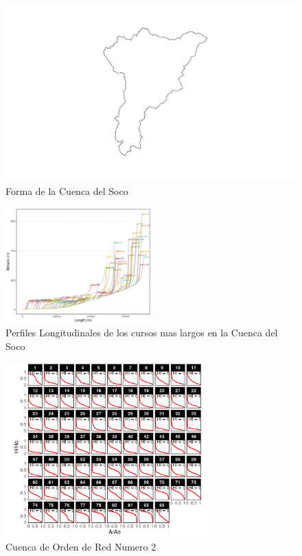 \documentclass[11pt,]{article}
\begin{document}
\begin{figure}
\centering
\includegraphics{form cu soc.png}
\caption{Forma de la Cuenca del Soco\label{mapauno}}
\end{figure}

\begin{figure}
\centering
\includegraphics[width=0.50000\textwidth]{perf mas largo.png}
\caption{Perfiles Longitudinales de los cursos mas largos en la Cuenca
del Soco\label{mapauno}}
\end{figure}

\begin{figure}
\centering
\includegraphics[width=0.70000\textwidth]{c de red o dos.png}
\caption{Cuenca de Orden de Red Numero 2\label{mapados}}
\end{figure}
\end{document}

